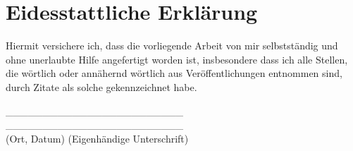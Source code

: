 \newpage
{} %

\section*{Eidesstattliche Erklärung}
Hiermit versichere ich, dass die vorliegende Arbeit von mir selbstständig und ohne unerlaubte Hilfe angefertigt worden ist, insbesondere dass ich alle Stellen, die wörtlich oder annähernd wörtlich aus Veröffentlichungen entnommen sind, durch Zitate als solche gekennzeichnet habe. 

\par\medskip
\par\medskip

\_\_\_\_\_\_\_\_\_\_\_\_\_\_\_\_\_\_\_\_\_\_\_\_ \hspace{1.5cm} \_\_\_\_\_\_\_\_\_\_\_\_\_\_\_\_\_\_\_\_\_\_\_\_ \\
(Ort, Datum)\hspace{4.5cm}
(Eigenhändige Unterschrift)
